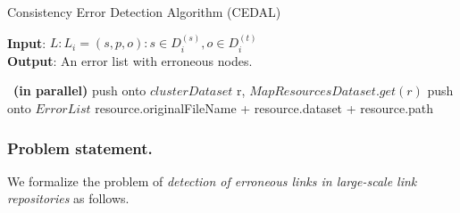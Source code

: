 %		

\begin{algorithm*} [htb] 
	\caption{Consistency Error Detection Algorithm (CEDAL)}
	\label{alg:err}
	\begin{multicols}{2}
	\textbf{Input}: $L:L_i={(s,p,o):s \in D_i^{(s)}, o \in D_i^{(t)}}$ \\
	\textbf{Output}: An error list with erroneous nodes.
	\begin{algorithmic}[1]
		~\textbf{(in parallel)}
		push onto $clusterDataset$ r, $MapResourcesDataset.get(r)$
		\EndFor
		push onto $ErrorList$ resource.originalFileName + resource.dataset + resource.path
		\EndIf
		\EndFor
		\EndFor
		\EndProcedure
		
		 
		\EndFor
		\EndProcedure
	\end{algorithmic}
	\end{multicols}
\end{algorithm*}

\subsubsection{Problem statement.}
We formalize the problem of \textit{detection of erroneous links in large-scale link repositories} as follows.

